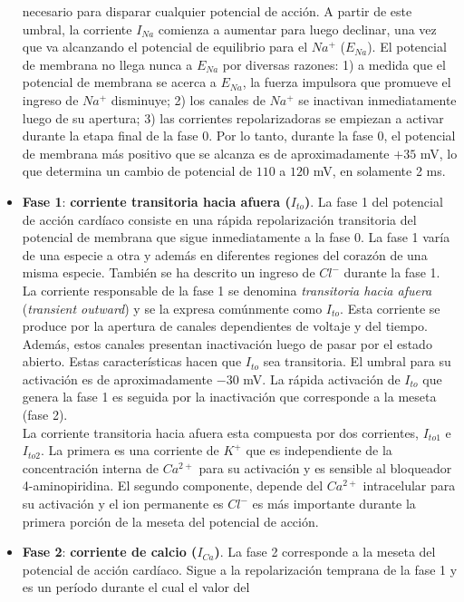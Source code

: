 \begin{itemize}
  necesario para disparar cualquier potencial de acción. A partir de este umbral, la corriente $I_{Na}$ comienza a
  aumentar para luego declinar, una vez que va alcanzando el potencial de equilibrio para el $Na^+$ ($E_{Na}$).
  El potencial de membrana no llega nunca a $E_{Na}$ por diversas razones: 1) a medida que el potencial de membrana
  se acerca a $E_{Na}$, la fuerza impulsora que promueve el ingreso de $Na^+$ disminuye; 2) los canales de $Na^+$
  se inactivan inmediatamente luego de su apertura; 3) las corrientes repolarizadoras se empiezan a activar durante
  la etapa final de la fase 0. Por lo tanto, durante la fase 0, el potencial de membrana más positivo que se alcanza
  es de aproximadamente $+35$ mV, lo que determina un cambio de potencial de $110$ a $120$ mV, en solamente 2 ms.
  \item \textbf{Fase 1}: \textbf{corriente transitoria hacia afuera ($I_{to}$)}. La fase 1 del potencial de acción
  cardíaco consiste en una rápida repolarización transitoria del potencial de membrana que sigue inmediatamente a la
  fase 0. La fase 1 varía de una especie a otra y además en diferentes regiones del corazón de una misma especie.
  También se ha descrito un ingreso de $Cl^-$ durante la fase 1. La corriente responsable de la fase 1 se denomina
  \textit{transitoria hacia afuera} (\textit{transient outward}) y se la expresa comúnmente como $I_{to}$.
  Esta corriente se produce por la apertura de canales dependientes de voltaje y del tiempo. Además, estos canales
  presentan inactivación luego de pasar por el estado abierto. Estas características hacen que $I_{to}$ sea
  transitoria. El umbral para su activación es de aproximadamente $-30$ mV. La rápida activación de $I_{to}$ que
  genera la fase 1 es seguida por la inactivación que corresponde a la meseta (fase 2). \\
  La corriente transitoria hacia afuera esta compuesta por dos corrientes, $I_{to1}$ e $I_{to2}$. La primera es
  una corriente de $K^+$ que es independiente de la concentración interna de $Ca^{2+}$ para su activación y
  es sensible al bloqueador 4-aminopiridina. El segundo componente, depende del $Ca^{2+}$ intracelular para su
  activación y el ion permanente es $Cl^-$ es más importante durante la primera porción de la meseta del potencial
  de acción.
  \item \textbf{Fase 2}: \textbf{corriente de calcio ($I_{Ca}$)}. La fase 2 corresponde a la meseta del potencial
  de acción cardíaco. Sigue a la repolarización temprana de la fase 1 y es un período durante el cual el valor del

\end{itemize}
